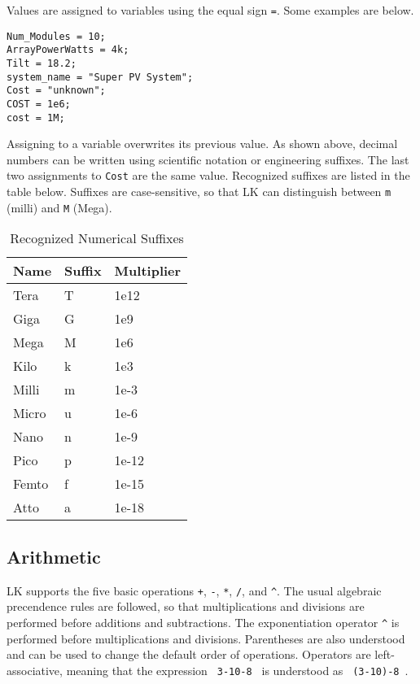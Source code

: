 \documentclass{article}
\begin{document}
Values are assigned to variables using the equal sign \texttt{=}.  Some examples are below.
\begin{verbatim}
Num_Modules = 10;
ArrayPowerWatts = 4k;
Tilt = 18.2;
system_name = "Super PV System";
Cost = "unknown";
COST = 1e6;
cost = 1M;
\end{verbatim}

Assigning to a variable overwrites its previous value.  As shown above, decimal numbers can be written using scientific notation or engineering suffixes.  The last two assignments to \texttt{Cost} are the same value.  Recognized suffixes are listed in the table below.  Suffixes are case-sensitive, so that LK can distinguish between \texttt{m} (milli) and \texttt{M} (Mega).

\begin{table}[ht]
\begin{center}
\begin{tabular}{lll}
Name & Suffix & Multiplier\\
\hline
Tera & T & 1e12\\
Giga & G & 1e9\\
Mega & M & 1e6\\
Kilo & k & 1e3\\
Milli & m & 1e-3\\
Micro & u & 1e-6\\
Nano & n & 1e-9\\
Pico & p & 1e-12\\
Femto & f & 1e-15\\
Atto & a & 1e-18\\
\end{tabular}
\caption{Recognized Numerical Suffixes}
\label{tab_engsuffixes}
\end{center}
\end{table}

\subsection{Arithmetic}

LK supports the five basic operations \texttt{+}, \texttt{-}, \texttt{*}, \texttt{/}, and \texttt{\^}.  The usual algebraic precendence rules are followed, so that multiplications and divisions are performed before additions and subtractions.  The exponentiation operator \texttt{\^} is performed before multiplications and divisions.  Parentheses are also understood and can be used to change the default order of operations.  Operators are left-associative, meaning that the expression \texttt{ 3-10-8 } is understood as \texttt{ (3-10)-8 }.
\end{document}
